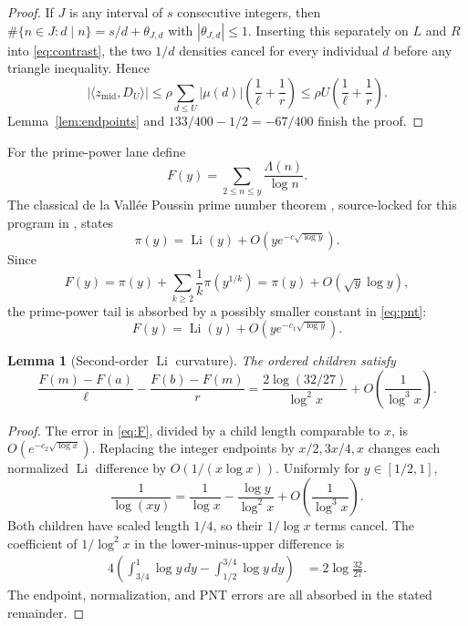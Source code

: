 \documentclass[10pt]{article}
\newtheorem{lemma}[theorem]{Lemma}
\newcommand{\ip}[2]{\langle #1,#2\rangle}
\newcommand{\zm}{z_{\mathrm{mid}}}
\newcommand{\Li}{\operatorname{Li}}
\begin{document}
\begin{proof}
If $J$ is any interval of $s$ consecutive integers, then
$\#\{n\in J:d\mid n\}=s/d+\theta_{J,d}$ with
$|\theta_{J,d}|\leq1$.  Inserting this separately on $L$ and $R$ into
\eqref{eq:contrast}, the two $1/d$ densities cancel for every individual
$d$ before any triangle inequality.  Hence
\[
 |\ip{\zm}{D_U}|
 \leq\rho\sum_{d\leq U}|\mu(d)|
       \left(\frac1\ell+\frac1r\right)
 \leq \rho U\left(\frac1\ell+\frac1r\right).
\]
Lemma~\ref{lem:endpoints} and $133/400-1/2=-67/400$ finish the proof.
\end{proof}

For the prime-power lane define
\[
 F(y)=\sum_{2\leq n\leq y}\frac{\Lambda(n)}{\log n}.
\]
The classical de la Vall\'ee Poussin prime number theorem
\cite{davenport,montgomery-vaughan,ik}, source-locked for this program in
\cite{tpc233}, states
\begin{equation}
 \pi(y)=\Li(y)+O\!\left(y e^{-c\sqrt{\log y}}\right).          \label{eq:pnt}
\end{equation}
Since
\[
 F(y)=\pi(y)+\sum_{k\geq2}\frac1k\pi(y^{1/k})
      =\pi(y)+O(\sqrt y\log y),
\]
the prime-power tail is absorbed by a possibly smaller constant in
\eqref{eq:pnt}:
\begin{equation}
 F(y)=\Li(y)+O\!\left(y e^{-c_1\sqrt{\log y}}\right).          \label{eq:F}
\end{equation}

\begin{lemma}[Second-order $\Li$ curvature]\label{lem:li}
The ordered children satisfy
\begin{equation}
 \frac{F(m)-F(a)}{\ell}-\frac{F(b)-F(m)}r
 =\frac{2\log(32/27)}{\log^2x}+O\!\left(\frac1{\log^3x}\right). \label{eq:curvature}
\end{equation}
\end{lemma}

\begin{proof}
The error in \eqref{eq:F}, divided by a child length comparable to $x$,
is $O(e^{-c_2\sqrt{\log x}})$.  Replacing the integer endpoints by
$x/2,3x/4,x$ changes each normalized $\Li$ difference by
$O(1/(x\log x))$.  Uniformly for $y\in[1/2,1]$,
\[
 \frac1{\log(xy)}=\frac1{\log x}-\frac{\log y}{\log^2x}
                  +O\!\left(\frac1{\log^3x}\right).
\]
Both children have scaled length $1/4$, so their $1/\log x$ terms cancel.
The coefficient of $1/\log^2x$ in the lower-minus-upper difference is
\begin{align*}
 4\left(\int_{3/4}^{1}\log y\,dy
       -\int_{1/2}^{3/4}\log y\,dy\right)
 &=2\log\frac{32}{27}.
\end{align*}
The endpoint, normalization, and PNT errors are all absorbed in the stated
remainder.
\end{proof}
\end{document}
